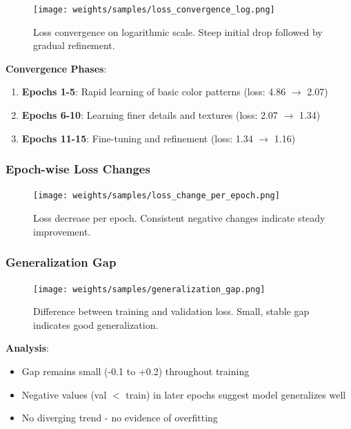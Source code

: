 \documentclass[12pt,a4paper]{article}
\begin{document}
\begin{figure}[H]
\centering
\texttt{[image: weights/samples/loss\_convergence\_log.png]}
\caption{Loss convergence on logarithmic scale. Steep initial drop followed by gradual refinement.}
\label{fig:convergence}
\end{figure}

\textbf{Convergence Phases}:
\begin{enumerate}
    \item \textbf{Epochs 1-5}: Rapid learning of basic color patterns (loss: 4.86 $\rightarrow$ 2.07)
    \item \textbf{Epochs 6-10}: Learning finer details and textures (loss: 2.07 $\rightarrow$ 1.34)
    \item \textbf{Epochs 11-15}: Fine-tuning and refinement (loss: 1.34 $\rightarrow$ 1.16)
\end{enumerate}

\subsubsection{Epoch-wise Loss Changes}

\begin{figure}[H]
\centering
\texttt{[image: weights/samples/loss\_change\_per\_epoch.png]}
\caption{Loss decrease per epoch. Consistent negative changes indicate steady improvement.}
\label{fig:loss_change}
\end{figure}

\subsubsection{Generalization Gap}

\begin{figure}[H]
\centering
\texttt{[image: weights/samples/generalization\_gap.png]}
\caption{Difference between training and validation loss. Small, stable gap indicates good generalization.}
\label{fig:gen_gap}
\end{figure}

\textbf{Analysis}:
\begin{itemize}
    \item Gap remains small (-0.1 to +0.2) throughout training
    \item Negative values (val $<$ train) in later epochs suggest model generalizes well
    \item No diverging trend - no evidence of overfitting
\end{itemize}
\end{document}
